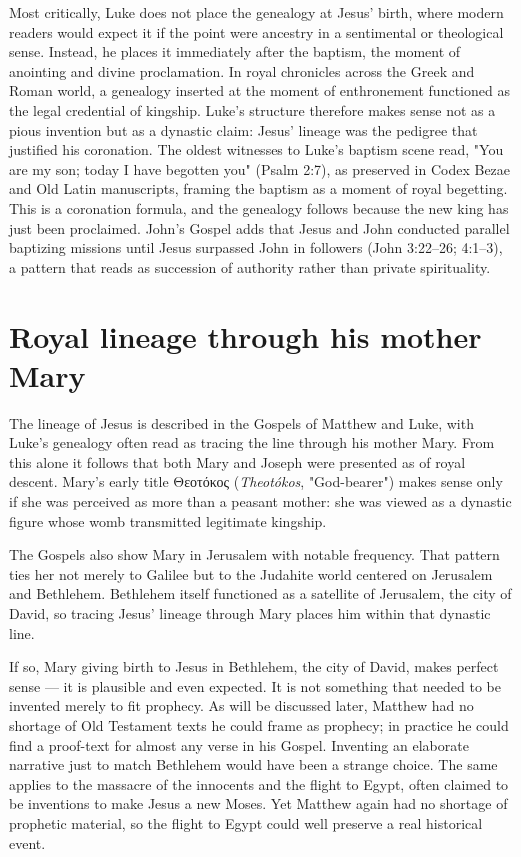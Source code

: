Most critically, Luke does not place the genealogy at Jesus’ birth, where modern readers would expect it if the point were ancestry in a sentimental or theological sense.
Instead, he places it immediately after the baptism, the moment of anointing and divine proclamation.
In royal chronicles across the Greek and Roman world, a genealogy inserted at the moment of enthronement functioned as the legal credential of kingship.
Luke's structure therefore makes sense not as a pious invention but as a dynastic claim: Jesus' lineage was the pedigree that justified his coronation.
The oldest witnesses to Luke's baptism scene read, "You are my son; today I have begotten you" (Psalm 2:7), as preserved in Codex Bezae and Old Latin manuscripts, framing the baptism as a moment of royal begetting.
This is a coronation formula, and the genealogy follows because the new king has just been proclaimed.
John's Gospel adds that Jesus and John conducted parallel baptizing missions until Jesus surpassed John in followers (John 3:22--26; 4:1--3), a pattern that reads as succession of authority rather than private spirituality.

\section{Royal lineage through his mother Mary}\label{sec:royal-lineage-through-his-mother-mary}

The lineage of Jesus is described in the Gospels of Matthew and Luke, with Luke's genealogy often read as tracing the line through his mother Mary.
From this alone it follows that both Mary and Joseph were presented as of royal descent.
Mary's early title Θεοτόκος (\textit{Theotókos}, "God-bearer") makes sense only if she was perceived as more than a peasant mother: she was viewed as a dynastic figure whose womb transmitted legitimate kingship.

The Gospels also show Mary in Jerusalem with notable frequency.
That pattern ties her not merely to Galilee but to the Judahite world centered on Jerusalem and Bethlehem.
Bethlehem itself functioned as a satellite of Jerusalem, the city of David, so tracing Jesus’ lineage through Mary places him within that dynastic line.

If so, Mary giving birth to Jesus in Bethlehem, the city of David, makes perfect sense --- it is plausible and even expected.
It is not something that needed to be invented merely to fit prophecy.
As will be discussed later, Matthew had no shortage of Old Testament texts he could frame as prophecy; in practice he could find a proof-text for almost any verse in his Gospel.
Inventing an elaborate narrative just to match Bethlehem would have been a strange choice.
The same applies to the massacre of the innocents and the flight to Egypt, often claimed to be inventions to make Jesus a new Moses.
Yet Matthew again had no shortage of prophetic material, so the flight to Egypt could well preserve a real historical event.

